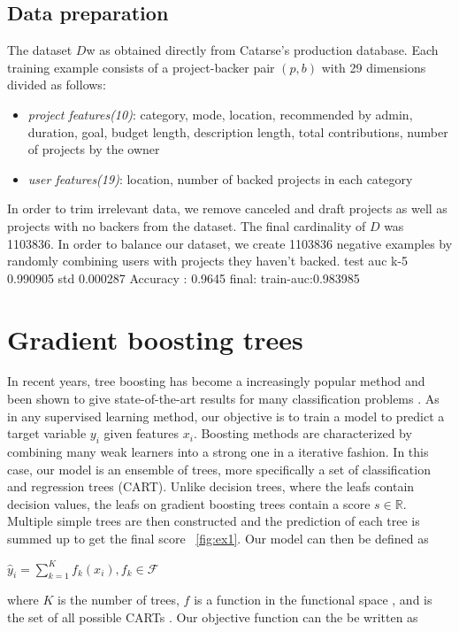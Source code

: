 \documentclass[cic,tc,english]{iiufrgs}
\begin{document}
\section{Data preparation}
The dataset \(D\)w as obtained directly from Catarse's production database. Each training example consists of a project-backer pair \((p,b)\) with 29 dimensions divided as follows:
\begin{itemize}
    \item \emph{project features(10)}: category, mode, location, recommended by admin, duration, goal, budget length, description length, total contributions, number of projects by the owner
    \item \emph{user features(19)}: location, number of backed projects in each category
\end{itemize}

In order to trim irrelevant data, we remove canceled and draft projects as well as projects with no backers from the dataset. The final cardinality of \(D\) was 1103836. In order to balance our dataset, we create 1103836 negative examples by randomly combining users with projects they haven't backed.
test auc k-5 0.990905 std 0.000287
Accuracy : 0.9645
final:
train-auc:0.983985

\chapter{Gradient boosting trees}
In recent years, tree boosting has become a increasingly popular method and been shown to give state-of-the-art results for many classification problems \cite{Li2012}. As in any supervised learning method, our objective is to train a model to predict a target variable \(y_i\) given features \(x_i\). Boosting methods are characterized by combining many weak learners into a strong one in a iterative fashion. In this case, our model is an ensemble of trees, more specifically a set of classification and regression trees (CART). Unlike decision trees, where the leafs contain decision values, the leafs on gradient boosting trees contain a score \(s \in \mathbb{R}\). Multiple simple trees are then constructed and the prediction of each tree is summed up to get the final score ~\ref{fig:ex1}. Our model can then be defined as

\(\hat{y}_i = \sum_{k=1}^K f_k(x_i), f_k \in \mathcal{F}\)

where \(K\) is the number of trees, \(f\) is a function in the functional space , and  is the set of all possible CARTs \cite{Chen2016}. Our objective function can the be written as
\end{document}
